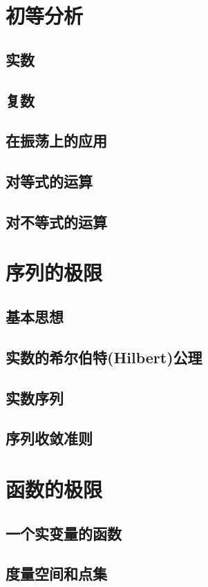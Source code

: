 \chapter{初等分析}
\section{实数}
\section{复数}
\section{在振荡上的应用}
\section{对等式的运算}
\section{对不等式的运算}

\chapter{序列的极限}
\section{基本思想}
\section{实数的希尔伯特(Hilbert)公理}
\section{实数序列}
\section{序列收敛准则}

\chapter{函数的极限}
\section{一个实变量的函数}
\section{度量空间和点集}

